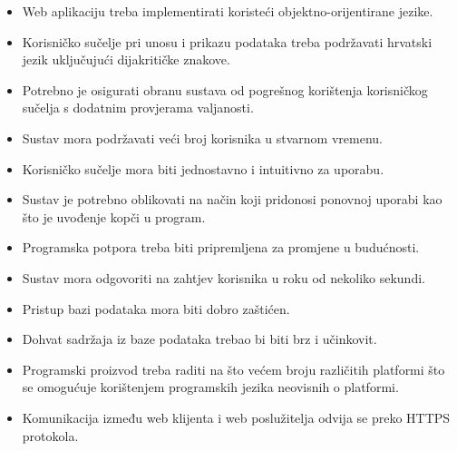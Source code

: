			\begin{itemize}
				\item Web aplikaciju treba implementirati koristeći objektno-orijentirane jezike.
				\item Korisničko sučelje pri unosu i prikazu podataka treba podržavati hrvatski jezik uključujući dijakritičke znakove. 
				\item Potrebno je osigurati obranu sustava od pogrešnog korištenja korisničkog sučelja s dodatnim provjerama valjanosti.
				\item Sustav mora podržavati veći broj korisnika u stvarnom vremenu.
				\item Korisničko sučelje mora biti jednostavno i intuitivno za uporabu.
				\item Sustav je potrebno oblikovati na način koji pridonosi ponovnoj uporabi kao što je uvođenje kopči u program. 
				\item Programska potpora treba biti pripremljena za promjene u budućnosti. 
				\item Sustav mora odgovoriti na zahtjev korisnika u roku od nekoliko sekundi. 
				\item Pristup bazi podataka mora biti dobro zaštićen. 
				\item Dohvat sadržaja iz baze podataka trebao bi biti brz i učinkovit. 
				\item Programski proizvod treba raditi na što većem broju različitih platformi što se omogućuje korištenjem programskih jezika neovisnih o platformi.
				\item Komunikacija između web klijenta i web poslužitelja odvija se preko HTTPS protokola. 
			\end{itemize}
		 
			 
			 
			 
	